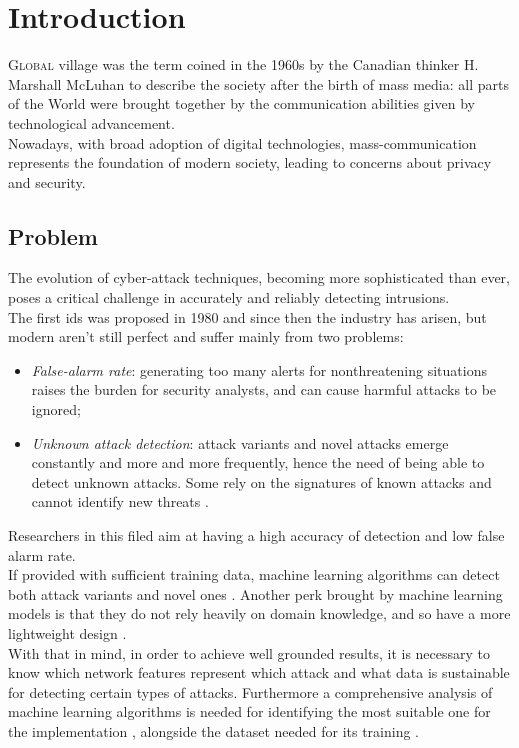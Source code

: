 \chapter{Introduction}
\label{chap:intro}

\lettrine[lines=3, findent=3pt, nindent=0pt]{G}{lobal} village was the term coined in the 1960s by the Canadian thinker H. Marshall McLuhan \cite{mcluhan1962} to describe the society after the birth of mass media: all parts of the World were brought together by the communication abilities given by technological advancement. \\
Nowadays, with broad adoption of digital technologies, mass-communication represents the foundation of modern society, leading to concerns about privacy and security.




\section{Problem}
\label{sec:problem}

The evolution of cyber-attack techniques, becoming more sophisticated than ever, poses a critical challenge in accurately and reliably detecting intrusions.\\ The first \gls{ids} was proposed in 1980 \cite{Andreson1980} and since then the industry has arisen, but modern  aren't still perfect and suffer mainly from two problems:
\begin{itemize}
    \item[\faCaretRight] \textit{False-alarm rate}: generating too many alerts for nonthreatening situations raises the burden for security analysts, and can cause harmful attacks to be ignored;
    \item[\faCaretRight] \textit{Unknown attack detection}: attack variants and novel attacks emerge constantly and more and more frequently, hence the need of being able to detect unknown attacks. Some  rely on the signatures of known attacks and cannot identify new threats \cite{Hodo2017}.
\end{itemize}
Researchers in this filed aim at having a high accuracy of detection and low false alarm rate. \\
If provided with sufficient training data, machine learning algorithms can detect both attack variants and novel ones \cite{Hodo2017}. Another perk brought by machine learning models is that they do not rely heavily on domain knowledge, and so have a more lightweight design \cite{Khraisat2019}. \\ With that in mind, in order to achieve well grounded results, it is necessary to know which network features represent which attack \cite{Iglesias2015} and what data is sustainable for detecting certain types of attacks. Furthermore a comprehensive analysis of machine learning algorithms is needed for identifying the most suitable one for the implementation \cite{Liu2019}, alongside the dataset needed for its training \cite{Sharafaldin2019}.


